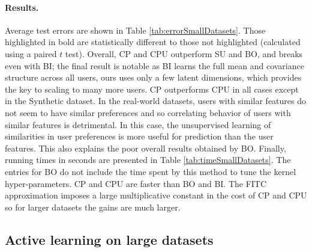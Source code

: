 \paragraph{Results.} Average test errors are shown in Table \ref{tab:errorSmallDatasets}. 
Those highlighted in bold are statistically different to those not highlighted
(calculated using a paired $t$ test). Overall, CP and CPU outperform SU and BO, and breaks even with BI;
the final result is notable as BI learns the full mean and covariance structure across all users,
ours uses only a few latent dimensions, which provides the key to scaling to many more users.
CP outperforms CPU in all cases except in the Synthetic dataset. In the real-world datasets, users with 
similar features do not seem to have similar preferences and so correlating behavior of users with similar features is detrimental.
In this case, the unsupervised learning of similarities in user preferences is more useful for prediction than the user features.
This also explains the poor overall results obtained by BO.
Finally, running times in seconds are presented in Table \ref{tab:timeSmallDatasets}. 
The entries for BO do not include the time spent by this method to tune the kernel hyper-parameters.
CP and CPU are faster than BO and BI. The FITC approximation imposes
a large multiplicative constant in the cost of CP and CPU so for larger datasets the gains are much larger.

\subsection{Active learning on large datasets}



